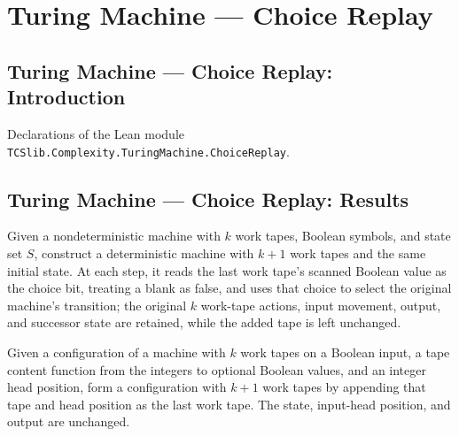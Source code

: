 \section{Turing Machine --- Choice Replay}
\subsection*{Turing Machine --- Choice Replay: Introduction}

Declarations of the Lean module \texttt{TCSlib.Complexity.TuringMachine.ChoiceReplay}.

\subsection*{Turing Machine --- Choice Replay: Results}

\begin{definition}
\label{Turing.NDTM.replayTM}
\leanok
{}
Given a nondeterministic machine with $k$ work tapes, Boolean symbols, and state set
$S$, construct a deterministic machine with $k+1$ work tapes and the same initial state.
At each step, it reads the last work tape's scanned Boolean value as the choice bit,
treating a blank as false, and uses that choice to select the original machine's
transition; the original $k$ work-tape actions, input movement, output, and successor
state are retained, while the added tape is left unchanged.
\end{definition}

\begin{definition}
\label{Turing.NDTM.withChoiceTape}
\leanok
{}
Given a configuration of a machine with $k$ work tapes on a Boolean input, a tape
content function from the integers to optional Boolean values, and an integer head
position, form a configuration with $k+1$ work tapes by appending that tape and head
position as the last work tape. The state, input-head position, and output are
unchanged.
\end{definition}

